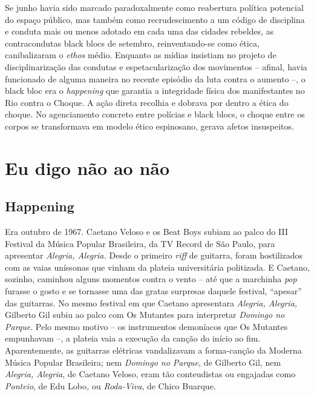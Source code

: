 Se junho havia sido marcado paradoxalmente como reabertura política
potencial do espaço público, mas também como recrudescimento a um código
de disciplina e conduta mais ou menos adotado em cada uma das cidades
rebeldes, as contracondutas black blocs de setembro, reinventando-se
como ética, canibalizaram o \emph{ethos} médio. Enquanto as mídias
insistiam no projeto de disciplinarização das condutas e
espetacularização dos movimentos -- afinal, havia funcionado de alguma
maneira no recente episódio da luta contra o aumento --, o black bloc
era o \emph{happening }que garantia a integridade física dos
manifestantes no Rio contra o Choque. A ação direta recolhia e dobrava
por dentro a ética do choque. No agenciamento concreto entre polícias e
black blocs, o choque entre os corpos se transformava em modelo ético
espinosano, gerava afetos insuspeitos.


\section{Eu digo não ao não}

\subsection{Happening}

Era outubro de 1967. Caetano Veloso e os Beat Boys
subiam ao palco do III Festival da Música Popular Brasileira, da TV
Record de São Paulo, para apresentar \emph{Alegria, Alegria. }Desde o
primeiro \emph{riff} de guitarra, foram hostilizados com as vaias
uníssonas que vinham da plateia universitária politizada. E Caetano,
sozinho, caminhou alguns momentos contra o vento -- até que a marchinha
\emph{pop} furasse o gosto e se tornasse uma das gratas surpresas
daquele festival, ``apesar'' das guitarras. No mesmo festival em que
Caetano apresentara \emph{Alegria, Alegria,} Gilberto Gil subiu ao palco
com Os Mutantes para interpretar \emph{Domingo no Parque}. Pelo mesmo
motivo -- os instrumentos demoníacos que Os Mutantes empunhavam --, a
plateia vaia a execução da canção do início ao fim. Aparentemente, as
guitarras elétricas vandalizavam a forma-canção da Moderna Música
Popular Brasileira; nem \emph{Domingo no Parque}, de Gilberto Gil, nem
\emph{Alegria, Alegria}, de Caetano Veloso, eram tão conteudistas ou
engajadas como \emph{Ponteio}, de Edu Lobo\emph{, }ou \emph{Roda-Viva},
de Chico Buarque.

